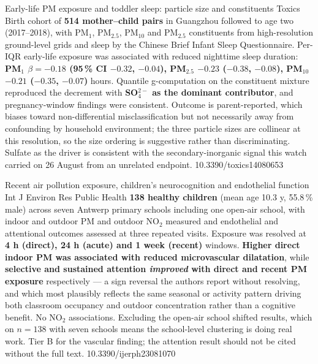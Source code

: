 \documentclass[10pt]{article}
\begin{document}
{Early-life PM exposure and toddler sleep: particle size and constituents}
{Toxics}
{Birth cohort of \textbf{514 mother--child pairs} in Guangzhou followed to age two
(2017--2018), with PM$_1$, PM$_{2.5}$, PM$_{10}$ and PM$_{2.5}$ constituents from
high-resolution ground-level grids and sleep by the Chinese Brief Infant Sleep
Questionnaire. Per-IQR early-life exposure was associated with reduced nighttime sleep
duration: \textbf{PM$_1$ $\beta = -0.18$ (95\,\% CI $-0.32$, $-0.04$), PM$_{2.5}$
$-0.23$ ($-0.38$, $-0.08$), PM$_{10}$ $-0.21$ ($-0.35$, $-0.07$)} hours. Quantile
g-computation on the constituent mixture reproduced the decrement with \textbf{SO$_4^{2-}$
as the dominant contributor}, and pregnancy-window findings were consistent. Outcome is
parent-reported, which biases toward non-differential misclassification but not
necessarily away from confounding by household environment; the three particle sizes are
collinear at this resolution, so the size ordering is suggestive rather than
discriminating. Sulfate as the driver is consistent with the secondary-inorganic signal
this watch carried on 26 August from an unrelated endpoint.}
{10.3390/toxics14080653}

{Recent air pollution exposure, children's neurocognition and endothelial function}
{Int J Environ Res Public Health}
{\textbf{138 healthy children} (mean age 10.3 y, 55.8\,\% male) across seven Antwerp
primary schools including one open-air school, with indoor and outdoor PM and outdoor
NO$_2$ measured and endothelial and attentional outcomes assessed at three repeated
visits. Exposure was resolved at \textbf{4 h (direct), 24 h (acute) and 1 week (recent)}
windows. \textbf{Higher direct indoor PM was associated with reduced microvascular
dilatation}, while \textbf{selective and sustained attention \emph{improved} with direct
and recent PM exposure} respectively --- a sign reversal the authors report without
resolving, and which most plausibly reflects the same seasonal or activity pattern
driving both classroom occupancy and outdoor concentration rather than a cognitive
benefit. No NO$_2$ associations. Excluding the open-air school shifted results, which on
$n = 138$ with seven schools means the school-level clustering is doing real work. Tier B
for the vascular finding; the attention result should not be cited without the full text.}
{10.3390/ijerph23081070}

\end{document}
